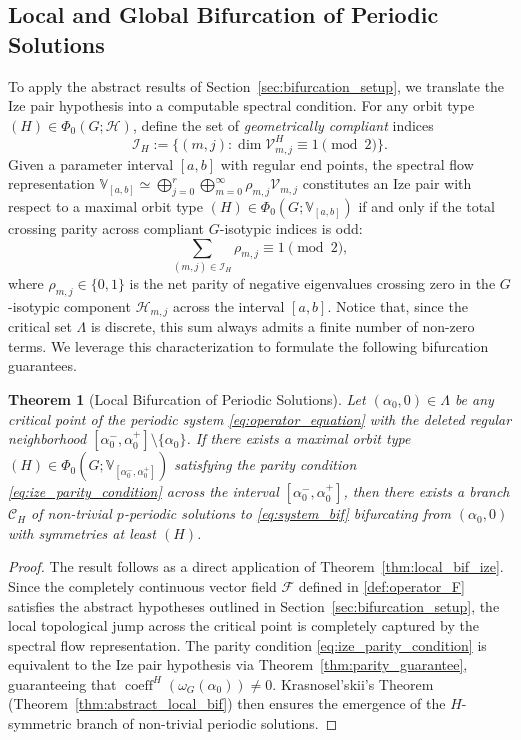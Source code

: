 \documentclass[twoside]{article}%
\newtheorem{theorem}{Theorem}[section]
\begin{document}
\subsection{Local and Global Bifurcation of Periodic Solutions}\label{sec:computation_lbi}

To apply the abstract results of
Section~\ref{sec:bifurcation_setup}, we translate the Ize pair hypothesis into a computable spectral condition. For any orbit type $(H) \in \Phi_0(G; \mathscr H)$, define the set of \emph{geometrically compliant} indices
\[
\mathcal I_H := \{(m,j) : \dim \mathcal V_{m,j}^H \equiv 1 \pmod 2\}.
\]
Given a parameter interval $[a,b]$ with regular end points, the spectral flow representation $\mathbb V_{[a,b]} \simeq \bigoplus_{j=0}^r \bigoplus_{m=0}^\infty \rho_{m,j} \mathcal V_{m,j}$ constitutes an Ize pair with respect to a maximal orbit type $(H) \in \Phi_0(G; \mathbb V_{[a,b]})$ if and only if  the total crossing parity across compliant $G$-isotypic indices is odd:
\begin{equation}\label{eq:ize_parity_condition}
\sum_{(m,j) \in \mathcal I_H} \rho_{m,j} \equiv 1 \pmod 2,
\end{equation}
where $\rho_{m,j} \in \{0,1\}$ is the net parity of negative eigenvalues crossing zero in the $G$-isotypic component $\mathscr H_{m,j}$ across the interval $[a,b]$. Notice that, since the critical set $\Lambda$ is discrete, this sum always admits a finite number of non-zero terms. We leverage this characterization to formulate the following bifurcation guarantees.
\begin{theorem}[Local Bifurcation of Periodic Solutions]\label{thm:local_bif_main}
Let $(\alpha_0,0) \in \Lambda$ be any critical point of the periodic system \eqref{eq:operator_equation} with the deleted regular neighborhood $[\alpha_0^-, \alpha_0^+] \setminus \{\alpha_0\}$. If there exists a maximal orbit type $(H) \in \Phi_0(G; \mathbb V_{[\alpha_0^-,\alpha_0^+]})$ satisfying the parity condition \eqref{eq:ize_parity_condition} across the interval $[\alpha_0^-, \alpha_0^+]$, then there exists a branch $\mathscr C_H$ of non-trivial $p$-periodic solutions to \eqref{eq:system_bif} bifurcating from $(\alpha_0,0)$ with symmetries at least $(H)$.
\end{theorem}
\begin{proof}
The result follows as a direct application of Theorem~\ref{thm:local_bif_ize}. Since the completely continuous vector field $\mathscr F$ defined in \eqref{def:operator_F} satisfies the abstract hypotheses outlined in Section~\ref{sec:bifurcation_setup}, the local topological jump across the critical point is completely captured by the spectral flow representation. The parity condition \eqref{eq:ize_parity_condition} is equivalent to the Ize pair hypothesis via Theorem~\ref{thm:parity_guarantee}, guaranteeing that $\operatorname{coeff}^H(\omega_G(\alpha_0)) \neq 0$. Krasnosel'skii's Theorem (Theorem~\ref{thm:abstract_local_bif}) then ensures the emergence of the $H$-symmetric branch of non-trivial periodic solutions.
\end{proof}
\end{document}
